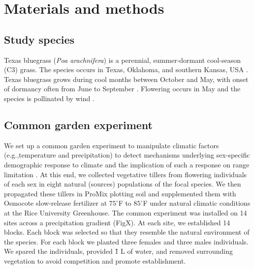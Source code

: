 \documentclass[11pt]{article}
\begin{document}
\section*{Materials and methods}

\subsection*{Study species}
Texas bluegrass (\textit{Poa arachnifera}) is a perennial, summer-dormant cool-season (C3) grass. 
The species occurs in Texas, Oklahoma, and southern Kansas, USA \citep{hitchcock1971manual}. 
Texas bluegrass grows during cool months between October and May, with onset of dormancy often from June to September \citep{kindiger2004interspecific}.
Flowering occurs in May and the species is pollinated by wind \citep{hitchcock1971manual}.

\subsection*{Common garden experiment}
We set up a common garden experiment to manipulate climatic factors (e.g.,temperature and precipitation) to detect mechanisms underlying sex-specific demographic response to climate and the implication of such a response on range limitation \citep{merow2017climate,schwinning2022common}. 
At this end, we collected vegetative tillers from flowering individuals of each sex in eight natural (sources) populations of the focal species.
We then propagated these tillers in ProMix plotting soil and supplemented them with Osmocote slow-release fertilizer at $75^\circ$F to $85^\circ$F under natural climatic conditions at the Rice University Greenhouse. 
The common experiment was installed on 14 sites across a precipitation gradient (FigX). At each site, we established 14 blocks. Each block was selected so that they resemble the natural environment of the species. For each block we planted three females and three males individuals. We spared the individuals, provided \~ 1 L  of water, and removed surrounding vegetation to avoid competition and promote establishment. 
\end{document}
